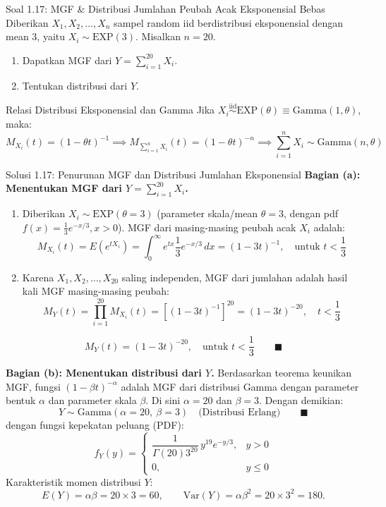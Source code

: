 \documentclass[10pt,twoside]{article}
\begin{document}
\begin{soalbox}{Soal 1.17: MGF \& Distribusi Jumlahan Peubah Acak Eksponensial Bebas}
Diberikan $X_1, X_2, \dots, X_n$ sampel random iid berdistribusi eksponensial dengan mean 3, yaitu $X_i \sim \text{EXP}(3)$. Misalkan $n = 20$.
\begin{enumerate}[label=(\alph*)]
  \item Dapatkan MGF dari $Y = \sum_{i=1}^{20} X_i$.
  \item Tentukan distribusi dari $Y$.
\end{enumerate}
\end{soalbox}

\begin{tipbox}{Relasi Distribusi Eksponensial dan Gamma}
Jika $X_i \overset{\mathrm{iid}}{\sim} \text{EXP}(\theta) \equiv \text{Gamma}(1, \theta)$, maka:
\[
M_{X_i}(t) = (1 - \theta t)^{-1} \implies M_{\sum_{i=1}^n X_i}(t) = (1 - \theta t)^{-n} \implies \sum_{i=1}^n X_i \sim \text{Gamma}(n, \theta)
\]
\end{tipbox}

\begin{solbox}{Solusi 1.17: Penurunan MGF dan Distribusi Jumlahan Eksponensial}
\textbf{Bagian (a): Menentukan MGF dari $Y = \sum_{i=1}^{20} X_i$.}
\begin{enumerate}[label=\arabic*.]
  \item Diberikan $X_i \sim \text{EXP}(\theta = 3)$ (parameter skala/mean $\theta = 3$, dengan pdf $f(x) = \frac{1}{3}e^{-x/3}, x > 0$).
  MGF dari masing-masing peubah acak $X_i$ adalah:
  \[
  M_{X_i}(t) = E(e^{tX_i}) = \int_0^\infty e^{tx} \frac{1}{3} e^{-x/3} \, dx = (1 - 3t)^{-1}, \quad \text{untuk } t < \frac{1}{3}
  \]
  \item Karena $X_1, X_2, \dots, X_{20}$ saling independen, MGF dari jumlahan adalah hasil kali MGF masing-masing peubah:
  \[
  M_Y(t) = \prod_{i=1}^{20} M_{X_i}(t) = \left[(1 - 3t)^{-1}\right]^{20} = (1 - 3t)^{-20}, \quad t < \frac{1}{3}
  \]
\end{enumerate}

\[
\boxed{M_Y(t) = (1 - 3t)^{-20}, \quad \text{untuk } t < \frac{1}{3}} \qquad \blacksquare
\]

\textbf{Bagian (b): Menentukan distribusi dari $Y$.}
Berdasarkan teorema keunikan MGF, fungsi $(1 - \beta t)^{-\alpha}$ adalah MGF dari distribusi Gamma dengan parameter bentuk $\alpha$ dan parameter skala $\beta$.
Di sini $\alpha = 20$ dan $\beta = 3$.
Dengan demikian:
\[
\boxed{Y \sim \text{Gamma}(\alpha = 20, \ \beta = 3) \quad \text{(Distribusi Erlang)}} \qquad \blacksquare
\]
dengan fungsi kepekatan peluang (PDF):
\[
f_Y(y) = \begin{cases} \dfrac{1}{\Gamma(20) 3^{20}} \, y^{19} e^{-y/3}, & y > 0 \\ 0, & y \le 0 \end{cases}
\]
Karakteristik momen distribusi $Y$:
\[
E(Y) = \alpha \beta = 20 \times 3 = 60, \qquad \mathrm{Var}(Y) = \alpha \beta^2 = 20 \times 3^2 = 180.
\]
\end{solbox}
\end{document}
